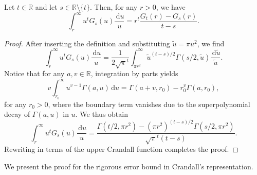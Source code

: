\documentclass[]{amsart}
\renewcommand{\d}{\,\mathrm{d}}
\numberwithin{mythm}{section}
\begin{document}
\begin{lemma}
\label{lem:g-int-revisited}
Let $t \in \mathds{R}$ and let $s \in \mathds{R} \setminus \{t\}$. Then, for any $r > 0$, we have
\[\int_r^\infty u^{t}G_s(u)\frac{\d u}{u} = r^{t} \frac{G_{t}(r) - G_s(r)}{t-s}.\]
\end{lemma}

\begin{proof}
After inserting the definition and substituting $\tilde u = \pi u^2$, we find
$$\int_r^\infty u^tG_s(u) \frac{\d u}{u}
=
\frac{1}{2 \sqrt{\pi}^t} \int_{\pi r^2}^\infty \tilde u^{(t-s)/2} \Gamma(s/2, \tilde u)  \frac{\d \tilde u}{\tilde u}.$$
Notice that for any $a,v\in \mathds R$, integration by parts yields
\[
v\int_{r_0}^\infty u^{v-1} \Gamma(a, u) \d u = \Gamma(a+v, r_0) - r_0^{v} \Gamma(a, r_0),\]
for any $r_0>0$,
where the boundary term vanishes due to
the superpolynomial decay of $\Gamma(a,u)$ in $u$.
We thus obtain
\[\int_r^\infty u^tG_s(u) \frac{\d u}{u} = \frac{\Gamma(t/2, \pi r^2) - (\pi r^2)^{(t-s)/2} \Gamma(s/2, \pi r^2)}{\sqrt{\pi}^t (t-s)}.\]
Rewriting in terms of the upper Crandall function completes the proof.
\end{proof}
We present the proof for the rigorous error bound in Crandall's representation. 
\end{document}
